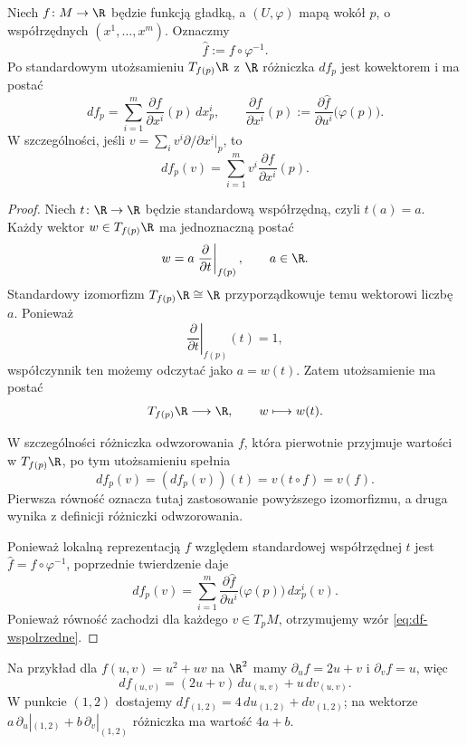 \begin{wniosek}
\label{tw:rozniczka-funkcji-wspolrzedne}
Niech $f\colon M\to\R$ będzie funkcją gładką,
a $(U,\varphi)$ mapą wokół $p$, o współrzędnych
$(x^1,\ldots,x^m)$. Oznaczmy
\[
\widehat f:=f\circ\varphi^{-1}.
\]
Po standardowym utożsamieniu $T_{f(p)}\R$ z $\R$
różniczka $df_p$ jest kowektorem i ma postać
\begin{equation}
\label{eq:df-wspolrzedne}
df_p=\sum_{i=1}^m
\frac{\partial f}{\partial x^i}(p)\,dx_p^i,
\qquad
\frac{\partial f}{\partial x^i}(p)
:=
\frac{\partial\widehat f}{\partial u^i}
\bigl(\varphi(p)\bigr).
\end{equation}
W szczególności, jeśli
$v=\sum_i v^i\partial/\partial x^i|_p$, to
\[
df_p(v)=\sum_{i=1}^m
v^i\frac{\partial f}{\partial x^i}(p).
\]
\end{wniosek}

\begin{proof}
Niech $t\colon\R\to\R$ będzie standardową
współrzędną, czyli $t(a)=a$. Każdy wektor
$w\in T_{f(p)}\R$ ma jednoznaczną postać
\[
w=a\left.\frac{\partial}{\partial t}\right|_{f(p)},
\qquad a\in\R.
\]
Standardowy izomorfizm $T_{f(p)}\R\cong\R$
przyporządkowuje temu wektorowi liczbę $a$.
Ponieważ
\[
\left.\frac{\partial}{\partial t}\right|_{f(p)}(t)=1,
\]
współczynnik ten możemy odczytać jako $a=w(t)$.
Zatem utożsamienie ma postać
\[
T_{f(p)}\R\longrightarrow\R,
\qquad w\longmapsto w(t).
\]

W szczególności różniczka odwzorowania
$f$, która pierwotnie przyjmuje wartości
w $T_{f(p)}\R$, po tym utożsamieniu spełnia
\[
df_p(v)=(df_p(v))(t)
=v(t\circ f)=v(f).
\]
Pierwsza równość oznacza tutaj zastosowanie
powyższego izomorfizmu, a druga wynika
z definicji różniczki odwzorowania.

Ponieważ lokalną reprezentacją $f$ względem
standardowej współrzędnej $t$ jest
$\widehat f=f\circ\varphi^{-1}$, poprzednie
twierdzenie daje
\[
df_p(v)=
\sum_{i=1}^m
\frac{\partial\widehat f}{\partial u^i}
\bigl(\varphi(p)\bigr)\,dx_p^i(v).
\]
Ponieważ równość zachodzi dla każdego
$v\in T_pM$, otrzymujemy wzór
\eqref{eq:df-wspolrzedne}.
\end{proof}

Na przykład dla $f(u,v)=u^2+uv$ na $\R^2$ mamy
$\partial_u f=2u+v$ i $\partial_v f=u$, więc
\[
 df_{(u,v)}=(2u+v)\,du_{(u,v)}+u\,dv_{(u,v)}.
\]
W punkcie $(1,2)$ dostajemy $df_{(1,2)}=4\,du_{(1,2)}+dv_{(1,2)}$;
na wektorze $a\,\partial_u|_{(1,2)}+b\,\partial_v|_{(1,2)}$
różniczka ma wartość $4a+b$.

